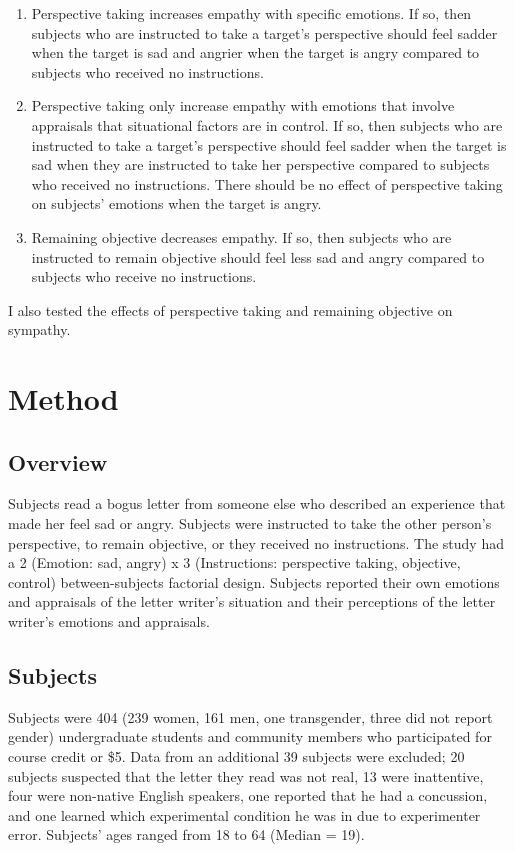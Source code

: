 \documentclass[man,a4paper,noextraspace,apacite]{apa6}\usepackage[]{graphicx}\usepackage[]{color}
\begin{document}
\begin{enumerate}
  \item Perspective taking increases empathy with specific emotions. If so, then subjects who are instructed to take a target's perspective should feel sadder when the target is sad and angrier when the target is angry compared to subjects who received no instructions. 
  \item Perspective taking only increase empathy with emotions that involve appraisals that situational factors are in control. If so, then subjects who are instructed to take a target's perspective should feel sadder when the target is sad when they are instructed to take her perspective compared to subjects who received no instructions. There should be no effect of perspective taking on subjects' emotions when the target is angry.
  \item Remaining objective decreases empathy. If so, then subjects who are instructed to remain objective should feel less sad and angry compared to subjects who receive no instructions.
\end{enumerate}

I also tested the effects of perspective taking and remaining objective on sympathy.

\section{Method}



\subsection{Overview}

    Subjects read a bogus letter from someone else who described an experience that made her feel sad or angry. Subjects were instructed to take the other person's perspective, to remain objective, or they received no instructions. The study had a 2 (Emotion: sad, angry) x 3 (Instructions: perspective taking, objective, control) between-subjects factorial design. Subjects reported their own emotions and appraisals of the letter writer's situation and their perceptions of the letter writer's emotions and appraisals.
    
\subsection{Subjects}

    Subjects were 404 (239 women, 161 men, one transgender, three did not report gender) undergraduate students and community members who participated for course credit or \$5. Data from an additional 39 subjects were excluded; 20 subjects suspected that the letter they read was not real, 13 were inattentive, four were non-native English speakers, one reported that he had a concussion, and one learned which experimental condition he was in due to experimenter error. Subjects' ages ranged from 18 to 64 (Median = 19).
\end{document}
